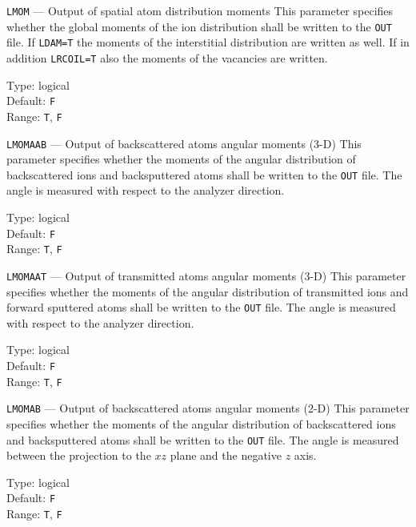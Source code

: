 \begin{keydescription}{\texttt{LMOM} --- Output of spatial atom distribution moments}
%
  This parameter specifies whether the global moments of the ion distribution shall be written 
  to the \texttt{OUT} file. If \texttt{LDAM=T} the moments of the interstitial distribution are
  written as well. If in addition \texttt{LRCOIL=T} also the moments of the vacancies are 
  written.
  \begin{keytab}
    Type:    \> logical \\
    Default: \> \texttt{F} \\
    Range:   \> \texttt{T}, \texttt{F} 
  \end{keytab}
\end{keydescription}

\begin{keydescription}{\texttt{LMOMAAB} --- Output of backscattered atoms
angular moments (3-D)}
%
  This parameter specifies whether the moments of the angular distribution 
  of backscattered ions and backsputtered atoms shall be written to the
  \texttt{OUT} file. The angle is measured with respect to the analyzer direction.
  \begin{keytab}
    Type:    \> logical \\
    Default: \> \texttt{F} \\
    Range:   \> \texttt{T}, \texttt{F} 
  \end{keytab}
\end{keydescription}

\begin{keydescription}{\texttt{LMOMAAT} --- Output of transmitted atoms angular
moments (3-D)}
%
  This parameter specifies whether the moments of the angular distribution 
  of transmitted ions and forward sputtered atoms shall be written to
  the \texttt{OUT} file. The angle is measured with respect to the analyzer direction.
  \begin{keytab}
    Type:    \> logical \\
    Default: \> \texttt{F} \\
    Range:   \> \texttt{T}, \texttt{F} 
  \end{keytab}
\end{keydescription}

\begin{keydescription}{\texttt{LMOMAB} --- Output of backscattered atoms
angular moments (2-D)}
%
  This parameter specifies whether the moments of the angular distribution 
  of backscattered ions and backsputtered atoms shall be written to the
  \texttt{OUT} file. The angle is measured
  between the projection to the $xz$ plane and the negative $z$ axis.
  \begin{keytab}
    Type:    \> logical \\
    Default: \> \texttt{F} \\
    Range:   \> \texttt{T}, \texttt{F} 
  \end{keytab}
\end{keydescription}


